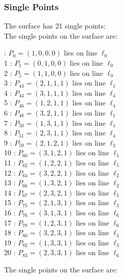 \documentclass{article}
\begin{document}
{\subsubsection*{Single Points}
The surface has 21 single points:\\
The single points on the surface are:\\
\begin{multicols}{2}
 : $P_{0}=( 1, 0, 0, 0 )$ lies on line $\ell_{0}$\\
1 : $P_{1}=( 0, 1, 0, 0 )$ lies on line $\ell_{0}$\\
2 : $P_{5}=( 1, 1, 0, 0 )$ lies on line $\ell_{0}$\\
3 : $P_{43}=( 2, 1, 1, 1 )$ lies on line $\ell_{1}$\\
4 : $P_{44}=( 3, 1, 1, 1 )$ lies on line $\ell_{4}$\\
5 : $P_{46}=( 1, 2, 1, 1 )$ lies on line $\ell_{4}$\\
6 : $P_{48}=( 3, 2, 1, 1 )$ lies on line $\ell_{1}$\\
7 : $P_{50}=( 1, 3, 1, 1 )$ lies on line $\ell_{1}$\\
8 : $P_{51}=( 2, 3, 1, 1 )$ lies on line $\ell_{4}$\\
9 : $P_{59}=( 2, 1, 2, 1 )$ lies on line $\ell_{2}$\\
10 : $P_{60}=( 3, 1, 2, 1 )$ lies on line $\ell_{5}$\\
11 : $P_{62}=( 1, 2, 2, 1 )$ lies on line $\ell_{5}$\\
12 : $P_{64}=( 3, 2, 2, 1 )$ lies on line $\ell_{2}$\\
13 : $P_{66}=( 1, 3, 2, 1 )$ lies on line $\ell_{2}$\\
14 : $P_{67}=( 2, 3, 2, 1 )$ lies on line $\ell_{5}$\\
15 : $P_{75}=( 2, 1, 3, 1 )$ lies on line $\ell_{3}$\\
16 : $P_{76}=( 3, 1, 3, 1 )$ lies on line $\ell_{6}$\\
17 : $P_{78}=( 1, 2, 3, 1 )$ lies on line $\ell_{6}$\\
18 : $P_{80}=( 3, 2, 3, 1 )$ lies on line $\ell_{3}$\\
19 : $P_{82}=( 1, 3, 3, 1 )$ lies on line $\ell_{3}$\\
20 : $P_{83}=( 2, 3, 3, 1 )$ lies on line $\ell_{6}$\\
\end{multicols}
The single points on the surface are:\\
}
\end{document}
